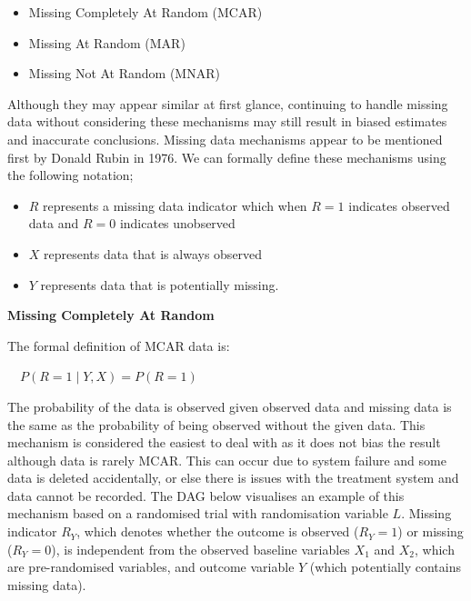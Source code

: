 \documentclass{article}
\providecommand{\tightlist}{%
  \setlength{\itemsep}{0pt}\setlength{\parskip}{0pt}}
\begin{document}
\begin{itemize}
\tightlist
\item
  Missing Completely At Random (MCAR)
\item
  Missing At Random (MAR)
\item
  Missing Not At Random (MNAR)
\end{itemize}

Although they may appear similar at first glance, continuing to handle
missing data without considering these mechanisms may still result in
biased estimates and inaccurate conclusions. Missing data mechanisms
appear to be mentioned first by Donald Rubin in 1976. We can formally
define these mechanisms using the following notation;

\newpage

\begin{itemize}
\tightlist
\item
  \(R\) represents a missing data indicator which when \(R=1\) indicates
  observed data and \(R=0\) indicates unobserved
\item
  \(X\) represents data that is always observed
\item
  \(Y\) represents data that is potentially missing.
\end{itemize}

\textbf{Missing Completely At Random}

The formal definition of MCAR data is:

\(\quad P(R = 1 \mid Y, X) = P(R = 1)\)

The probability of the data is observed given observed data and missing
data is the same as the probability of being observed without the given
data. This mechanism is considered the easiest to deal with as it does
not bias the result although data is rarely MCAR. This can occur due to
system failure and some data is deleted accidentally, or else there is
issues with the treatment system and data cannot be recorded. The DAG
below visualises an example of this mechanism based on a randomised
trial with randomisation variable \(L\). Missing indicator \(R_Y\),
which denotes whether the outcome is observed (\(R_Y = 1\)) or missing
(\(R_Y = 0\)), is independent from the observed baseline variables
\(X_1\) and \(X_2\), which are pre-randomised variables, and outcome
variable \(Y\) (which potentially contains missing data).
\end{document}
